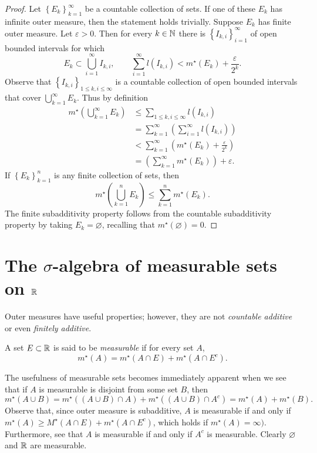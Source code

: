 \begin{proof}
	Let $\left\{
		E_k
	\right\}_{k=1}^\infty$
	be a countable collection of sets.
	If one of these $E_k$ has infinite outer measure, then the statement
	holds trivially.
	Suppose $E_k$ has finite outer measure.
	Let $\varepsilon > 0$. Then for every $k \in \mathbb{N}$
	there is $\left\{
		I_{k,i}
	\right\}_{i=1}^\infty$ of open bounded intervals for which
	\[
		E_k \subset \bigcup_{i=1}^\infty I_{k,i}, \qquad
		\sum^{\infty}_{i=1} l(I_{k,i}) < m^\star(E_k) + \frac{\varepsilon}{2^k}.
	\]
	Observe that $\left\{
		I_{k,i}
	\right\}_{1 \leq k,i \leq \infty}$ is a countable collection of open
	bounded intervals that cover $\bigcup_{k=1}^\infty E_k$.
	Thus by definition
	\begin{align*}
		m^\star \left( 
			\bigcup_{k=1}^\infty E_k 
		\right)
		&\leq \sum_{1 \leq k, i \leq \infty} l(I_{k,i}) \\
		&= \sum_{k=1}^\infty \left( 
			\sum_{i=1}^\infty l(I_{k,i}) 
		\right) \\
		&< \sum_{k=1}^\infty \left( 
			m^\star(E_k) + \frac{\varepsilon}{2^k}  
		\right) \\
		&= \left( 
			\sum_{k=1}^\infty m^\star (E_k)
		\right) + \varepsilon.
	\end{align*}
	If $\left\{
		E_k
	\right\}_{k=1}^n$ is any finite collection of sets, then
	\[
		m^\star\left( 
			\bigcup_{k=1}^n E_k 
		\right) \leq \sum^{n}_{k=1} m^\star(E_k).
	\]
	The finite subadditivity property follows from the countable subadditivity
	property by taking $E_k = \varnothing$, recalling that 
	$m^\star(\varnothing) = 0$.
\end{proof}

\section{The $\sigma$-algebra of measurable sets on $\mathbb{R}$}

Outer measures have useful properties; however, they are not \emph{countable
additive} or even \emph{finitely additive}.

\begin{definition}
	A set $E \subset \mathbb{R}$ is said to be \emph{measurable} if for every
	set $A$,
	\[
		m^\star(A) = m^\star(A \cap E) + m^\star(A \cap E^c).
	\]
\end{definition}

The usefulness of measurable sets becomes immediately apparent when we
see that if $A$ is measurable is disjoint from some set $B$, then
\[
	m^\star(A \cup B) = m^\star((A \cup B) \cap A)
		+ m^\star((A \cup B) \cap A^c)
	= m^\star(A) + m^\star(B).
\]
Observe that, since outer measure is subadditive, $A$ is measurable
if and only if $m^\star(A) \geq M^\star(A \cap E) + m^\star(A \cap E^c)$,
which holds if $m^\star(A) = \infty)$. Furthermore, see that $A$ is
measurable if and only if $A^c$ is measurable.
Clearly $\varnothing$ and $\mathbb{R}$ are measurable.
